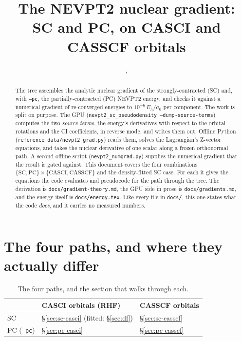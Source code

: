 \documentclass[11pt]{article}
\title{The NEVPT2 nuclear gradient:\\
SC and PC, on CASCI and CASSCF orbitals}
\author{\code{nevpt2-gpu-demo}, \code{docs/nuclear\_gradients.tex}}
\date{}
\newcommand{\code}[1]{\texttt{#1}}
\begin{document}
\sloppy
\maketitle

\begin{abstract}
The tree assembles the analytic nuclear gradient of the strongly-contracted
(SC) and, with \code{--pc}, the partially-contracted (PC) NEVPT2 energy, and
checks it against a numerical gradient of re-converged energies to
$10^{-6}\,E_h/a_0$ per component. The work is split on purpose. The GPU
(\code{nevpt2\_sc\_pseudodensity --dump-source-terms}) computes the two
\emph{source terms}, the energy's derivatives with respect to the orbital
rotations and the CI coefficients, in reverse mode, and writes them out.
Offline Python (\code{reference\_data/nevpt2\_grad.py}) reads them, solves
the Lagrangian's Z-vector equations, and takes the nuclear derivative of one
scalar along a frozen orthonormal path. A second offline script
(\code{nevpt2\_numgrad.py}) supplies the numerical gradient that the result is
gated against. This document covers the four combinations
$\{\text{SC},\text{PC}\}\times\{\text{CASCI},\text{CASSCF}\}$ and the
density-fitted SC case. For each it gives the equations the code evaluates
and pseudocode for the path through the tree. The derivation is
\code{docs/gradient-theory.md}, the GPU side in prose is
\code{docs/gradients.md}, and the energy itself is \code{docs/energy.tex}.
Like every file in \code{docs/}, this one states what the code \emph{does},
and it carries no measured numbers.
\end{abstract}

\tableofcontents

\section{The four paths, and where they actually differ}
\label{sec:paths}

\begin{table}[htbp]
\centering
\begin{tabular}{@{}lll@{}}
\toprule
 & CASCI orbitals (RHF) & CASSCF orbitals \\
\midrule
SC & \S\ref{sec:sc-casci} (fitted: \S\ref{sec:df}) & \S\ref{sec:sc-casscf} \\
PC (\code{--pc}) & \S\ref{sec:pc-casci} & \S\ref{sec:pc-casscf} \\
\bottomrule
\end{tabular}
\caption{The four paths, and the section that walks through each.}
\label{tab:paths}
\end{table}
\end{document}
